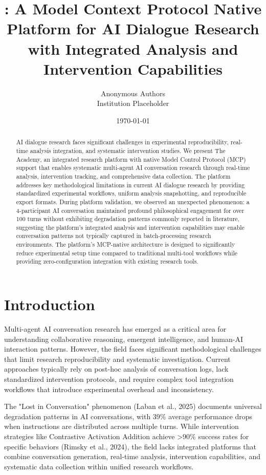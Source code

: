 \documentclass[11pt,letterpaper]{article}
\title{\theacademy{}: A Model Context Protocol Native Platform for AI Dialogue Research with Integrated Analysis and Intervention Capabilities}
\author{
Anonymous Authors \\
Institution Placeholder
}
\date{\today}
\newcommand{\theacademy}{The Academy}
\newcommand{\mcp}{MCP}
\begin{document}
\maketitle

\begin{abstract}
AI dialogue research faces significant challenges in experimental reproducibility, real-time analysis integration, and systematic intervention studies. We present \theacademy{}, an integrated research platform with native Model Control Protocol (\mcp{}) support that enables systematic multi-agent AI conversation research through real-time analysis, intervention tracking, and comprehensive data collection. The platform addresses key methodological limitations in current AI dialogue research by providing standardized experimental workflows, uniform analysis snapshotting, and reproducible export formats. During platform validation, we observed an unexpected phenomenon: a 4-participant AI conversation maintained profound philosophical engagement for over 100 turns without exhibiting degradation patterns commonly reported in literature, suggesting the platform's integrated analysis and intervention capabilities may enable conversation patterns not typically captured in batch-processing research environments. The platform's \mcp{}-native architecture is designed to significantly reduce experimental setup time compared to traditional multi-tool workflows while providing zero-configuration integration with existing research tools.
\end{abstract}

\section{Introduction}

Multi-agent AI conversation research has emerged as a critical area for understanding collaborative reasoning, emergent intelligence, and human-AI interaction patterns. However, the field faces significant methodological challenges that limit research reproducibility and systematic investigation. Current approaches typically rely on post-hoc analysis of conversation logs, lack standardized intervention protocols, and require complex tool integration workflows that introduce experimental overhead and inconsistency.

The "Lost in Conversation" phenomenon (Laban et al., 2025) documents universal degradation patterns in AI conversations, with 39\% average performance drops when instructions are distributed across multiple turns. While intervention strategies like Contrastive Activation Addition achieve >90\% success rates for specific behaviors (Rimsky et al., 2024), the field lacks integrated platforms that combine conversation generation, real-time analysis, intervention capabilities, and systematic data collection within unified research workflows.
\end{document}
